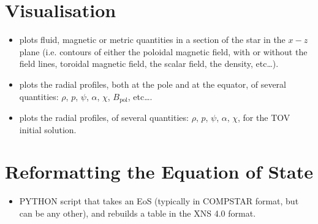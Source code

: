 \documentclass[letterpaper,10pt,english]{sphinxmanual}
\begin{document}
\section{Visualisation}
\label{\detokenize{files_outputs:visualisation}}\begin{itemize}
\item {} 
\sphinxAtStartPar
{} \sphinxhyphen{} plots fluid, magnetic or metric quantities in a section of the star in the \(x-z\) plane (i.e. contours of either the poloidal magnetic field, with or without the field lines, toroidal magnetic field, the scalar field, the density, etc…).

\item {} 
\sphinxAtStartPar
{} \sphinxhyphen{} plots the radial profiles, both at the pole and at the equator, of several quantities: \(\rho\), \(p\), \(\psi\), \(\alpha\), \(\chi\), \(B_\mathrm{pol}\), etc….

\item {} 
\sphinxAtStartPar
{} \sphinxhyphen{} plots the radial profiles, of several quantities: \(\rho\), \(p\), \(\psi\), \(\alpha\), \(\chi\), for the TOV initial solution.

\end{itemize}


\section{Reformatting the Equation of State}
\label{\detokenize{files_outputs:reformatting-the-equation-of-state}}\begin{itemize}
\item {} 
\sphinxAtStartPar
{} \sphinxhyphen{} PYTHON script that takes an EoS (typically in COMPSTAR format, but can be any other), and rebuilds a table in the XNS 4.0 format.

\end{itemize}

\sphinxstepscope
\end{document}
